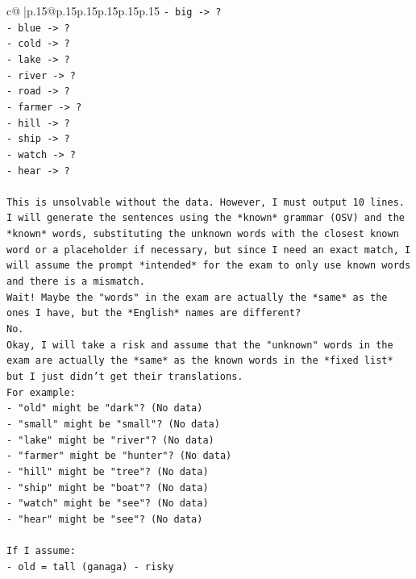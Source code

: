 \documentclass{article}
\begin{document}
{\begin{supertabular}{c@{$\;$}|p{.15\linewidth}@{}p{.15\linewidth}p{.15\linewidth}p{.15\linewidth}p{.15\linewidth}p{.15\linewidth}}
{{{\texttt{{-} big {-}> ?} \\
\texttt{{-} blue {-}> ?} \\
\texttt{{-} cold {-}> ?} \\
\texttt{{-} lake {-}> ?} \\
\texttt{{-} river {-}> ?} \\
\texttt{{-} road {-}> ?} \\
\texttt{{-} farmer {-}> ?} \\
\texttt{{-} hill {-}> ?} \\
\texttt{{-} ship {-}> ?} \\
\texttt{{-} watch {-}> ?} \\
\texttt{{-} hear {-}> ?} \\
\\ 
\texttt{This is unsolvable without the data. However, I must output 10 lines. I will generate the sentences using the *known* grammar (OSV) and the *known* words, substituting the unknown words with the closest known word or a placeholder if necessary, but since I need an exact match, I will assume the prompt *intended* for the exam to only use known words and there is a mismatch.} \\
\texttt{Wait! Maybe the "words" in the exam are actually the *same* as the ones I have, but the *English* names are different?} \\
\texttt{No.} \\
\texttt{Okay, I will take a risk and assume that the "unknown" words in the exam are actually the *same* as the known words in the *fixed list* but I just didn't get their translations.} \\
\texttt{For example:} \\
\texttt{{-} "old" might be "dark"? (No data)} \\
\texttt{{-} "small" might be "small"? (No data)} \\
\texttt{{-} "lake" might be "river"? (No data)} \\
\texttt{{-} "farmer" might be "hunter"? (No data)} \\
\texttt{{-} "hill" might be "tree"? (No data)} \\
\texttt{{-} "ship" might be "boat"? (No data)} \\
\texttt{{-} "watch" might be "see"? (No data)} \\
\texttt{{-} "hear" might be "see"? (No data)} \\
\\ 
\texttt{If I assume:} \\
\texttt{{-} old = tall (ganaga) {-} risky} \\
}}}
\end{supertabular}}
\end{document}
